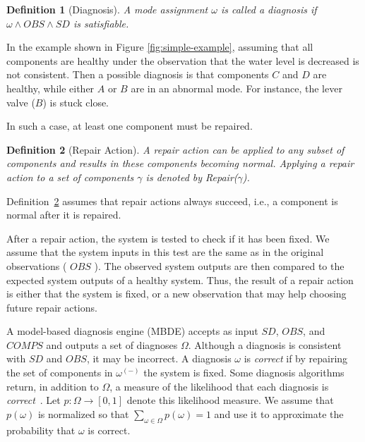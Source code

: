 \documentclass[letterpaper]{article}
\newcommand\meir[1]{\textcolor{red}{meir: #1}}
\newtheorem{definition}{Definition}
\newcommand{\COMPS}{\textit{COMPS}}
\newcommand{\SD}{\textit{SD}}
\newcommand{\OBS}{\textit{OBS}}
\begin{document}
\begin{definition}[Diagnosis]
A mode assignment $\omega$ is called a diagnosis if $\omega \wedge \OBS \wedge \SD$ is satisfiable.
\end{definition}

In the example shown in Figure \ref{fig:simple-example}, assuming that all components are healthy under the observation that the water level is decreased is not consistent. Then a possible diagnosis is that components $C$ and $D$ are healthy, while either $A$ or $B$ are in an abnormal mode. For instance, the lever valve ($B$) is stuck close.

\noindent In such a case, at least one component must be repaired.

\begin{definition}[Repair Action]
A repair action can be applied to any subset of components and results in these components becoming normal. Applying a repair action to a set of components $\gamma$ is denoted by Repair($\gamma$).
\label{def:repairAction}
\end{definition}
Definition~\ref{def:repairAction} assumes that repair actions always succeed, i.e., a component is normal after it is repaired. %

After a repair action, the system is tested to check if it has been fixed.
We assume that the system inputs in this test are the same as in the original observations ( $\OBS$ ). The observed system outputs are then compared to the expected system outputs of a healthy system. Thus, the result of a repair action is either that the system is fixed, or a new observation that may help choosing future repair actions.




A model-based diagnosis engine (MBDE) accepts as input $\SD$, $\OBS$, and $\COMPS$ and outputs a set of diagnoses $\Omega$. Although a diagnosis is consistent with $\SD$ and $\OBS$, it may be incorrect. A diagnosis $\omega$ is {\em correct} if by repairing the set of components in $\omega^{(-)}$ the system is fixed. Some diagnosis algorithms return, in addition to $\Omega$, a measure of the likelihood that each diagnosis is {\em correct}~\cite{williams2007conflict,abreu2011simultaneousDebugging}. Let $p: \Omega \rightarrow [0,1]$ denote this likelihood measure. We assume that $p(\omega)$ is normalized so that $\sum_{\omega\in\Omega} p(\omega)=1$ and use it to approximate the probability that $\omega$ is correct.
\end{document}
